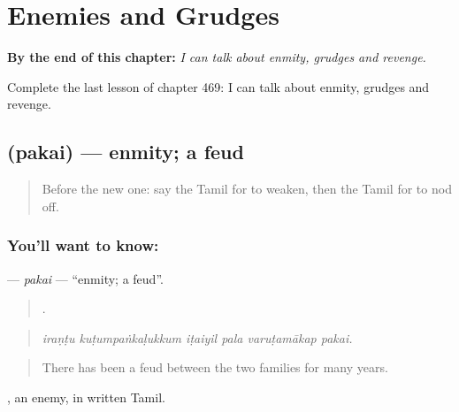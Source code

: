 
\chapter{Enemies and Grudges}
\label{ch:ta-enemies-and-grudges}

\begin{chapteropening}
\textbf{By the end of this chapter:} \emph{I can talk about enmity, grudges and revenge.}

Complete the last lesson of chapter 469: I can talk about enmity, grudges and revenge.
\end{chapteropening}

\section[\texorpdfstring{\ta{பகை} (pakai)}{பகை (pakai)}]{ (pakai) — enmity; a feud}

\label{lesson:TA-C469-pakai}



\begin{quote}
Before the new one: say the Tamil for to weaken, then the Tamil for to nod off.
\end{quote}

\subsection*{You'll want to know: }
\textbf{} — \emph{pakai} — \textquotedblleft{}enmity; a feud\textquotedblright{}.

\begin{quote}
     .
\end{quote}

\begin{quote}
\emph{iraṇṭu kuṭumpaṅkaḷukkum iṭaiyil pala varuṭamākap pakai.}
\end{quote}

\begin{quote}
There has been a feud between the two families for many years.
\end{quote}

, an enemy, in written Tamil.

